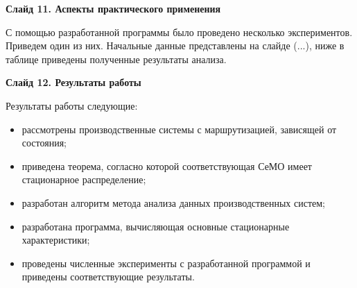 \documentclass[a4paper,14pt]{extarticle}
\theoremstyle{note}
\begin{document}

\textbf{Слайд 11. Аспекты практического применения}

С помощью разработанной программы было проведено несколько экспериментов. Приведем один из них. Начальные данные представлены на слайде (...), ниже в таблице приведены полученные результаты анализа.


\textbf{Слайд 12. Результаты работы}

Результаты работы следующие:

\begin{itemize}
\item рассмотрены производственные системы с маршрутизацией, зависящей от состояния;
\item приведена теорема, согласно которой соответствующая СеМО имеет стационарное распределение;
\item разработан алгоритм метода анализа данных производственных систем;
\item разработана программа, вычисляющая основные стационарные характеристики;
\item проведены численные эксперименты с разработанной программой и приведены соответствующие результаты.
\end{itemize}
\end{document}
